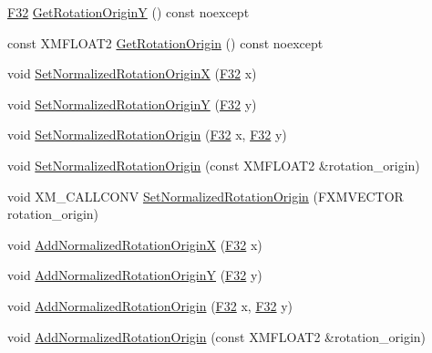 \begin{DoxyCompactItemize}
\item 
\hyperlink{namespacemage_aa97e833b45f06d60a0a9c4fc22ae02c0}{F32} \hyperlink{classmage_1_1_sprite_transform_a762326097353f1303eede1b716cb9f51}{Get\+Rotation\+OriginY} () const noexcept
\item 
const X\+M\+F\+L\+O\+A\+T2 \hyperlink{classmage_1_1_sprite_transform_aa7a6f3cad38ed9231455de722e60040c}{Get\+Rotation\+Origin} () const noexcept
\item 
void \hyperlink{classmage_1_1_sprite_transform_a01087d541331e849727c7b8d338bab6e}{Set\+Normalized\+Rotation\+OriginX} (\hyperlink{namespacemage_aa97e833b45f06d60a0a9c4fc22ae02c0}{F32} x)
\item 
void \hyperlink{classmage_1_1_sprite_transform_ab940629ca5a67e28fa470800bcef705d}{Set\+Normalized\+Rotation\+OriginY} (\hyperlink{namespacemage_aa97e833b45f06d60a0a9c4fc22ae02c0}{F32} y)
\item 
void \hyperlink{classmage_1_1_sprite_transform_aeab79024ac1941d9865a202258238dfe}{Set\+Normalized\+Rotation\+Origin} (\hyperlink{namespacemage_aa97e833b45f06d60a0a9c4fc22ae02c0}{F32} x, \hyperlink{namespacemage_aa97e833b45f06d60a0a9c4fc22ae02c0}{F32} y)
\item 
void \hyperlink{classmage_1_1_sprite_transform_a8cb44224f42f9b7811b39427c2745b3f}{Set\+Normalized\+Rotation\+Origin} (const X\+M\+F\+L\+O\+A\+T2 \&rotation\+\_\+origin)
\item 
void X\+M\+\_\+\+C\+A\+L\+L\+C\+O\+NV \hyperlink{classmage_1_1_sprite_transform_a820e4d9bcfaf0a66b325c5229c06de78}{Set\+Normalized\+Rotation\+Origin} (F\+X\+M\+V\+E\+C\+T\+OR rotation\+\_\+origin)
\item 
void \hyperlink{classmage_1_1_sprite_transform_a005c488bb8601f0defe11b3496a4a838}{Add\+Normalized\+Rotation\+OriginX} (\hyperlink{namespacemage_aa97e833b45f06d60a0a9c4fc22ae02c0}{F32} x)
\item 
void \hyperlink{classmage_1_1_sprite_transform_a322c799c3cc72ac44dbc1a2ed1234a67}{Add\+Normalized\+Rotation\+OriginY} (\hyperlink{namespacemage_aa97e833b45f06d60a0a9c4fc22ae02c0}{F32} y)
\item 
void \hyperlink{classmage_1_1_sprite_transform_af5b99182b93907b946df86a30bdf9e9b}{Add\+Normalized\+Rotation\+Origin} (\hyperlink{namespacemage_aa97e833b45f06d60a0a9c4fc22ae02c0}{F32} x, \hyperlink{namespacemage_aa97e833b45f06d60a0a9c4fc22ae02c0}{F32} y)
\item 
void \hyperlink{classmage_1_1_sprite_transform_a40a99b8114f448717ce1f7c7644ea6ee}{Add\+Normalized\+Rotation\+Origin} (const X\+M\+F\+L\+O\+A\+T2 \&rotation\+\_\+origin)

\end{DoxyCompactItemize}
